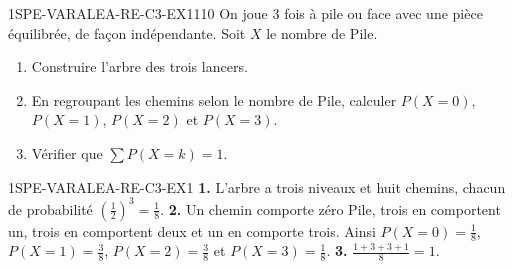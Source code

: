 
\begin{exercice}{1SPE-VARALEA-RE-C3-EX1}{1}{10}
On joue $3$ fois à pile ou face avec une pièce équilibrée, de façon indépendante. Soit $X$ le nombre de Pile.
\begin{enumerate}
  \item Construire l'arbre des trois lancers.
  \item En regroupant les chemins selon le nombre de Pile, calculer $P(X=0)$, $P(X=1)$, $P(X=2)$ et $P(X=3)$.
  \item Vérifier que $\sum P(X=k) = 1$.
\end{enumerate}
\end{exercice}


\begin{corrige}{1SPE-VARALEA-RE-C3-EX1}
\textbf{1.} L'arbre a trois niveaux et huit chemins, chacun de probabilité $\left(\frac12\right)^3=\frac18$.
\textbf{2.} Un chemin comporte zéro Pile, trois en comportent un, trois en comportent deux et un en comporte trois. Ainsi $P(X=0)=\frac18$, $P(X=1)=\frac38$, $P(X=2)=\frac38$ et $P(X=3)=\frac18$.
\textbf{3.} $\frac{1+3+3+1}{8} = 1$. \checkmark
\end{corrige}
